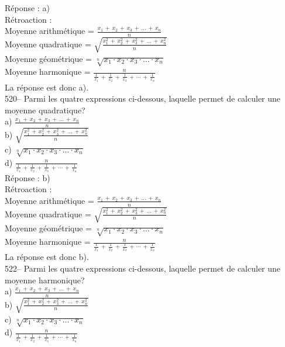 ﻿\documentclass[letterpaper, 12pt]{article}
\begin{document}
R\'eponse : a)\\

R\'etroaction : \\
Moyenne arithm\'etique =
$\frac{x_1\,+\,x_2\,+\,x_3\,+\,\ldots\,+\,x_n}{n}$\\[2mm]
Moyenne quadratique =
$\sqrt{\frac{x_1^{2}\,+\,x_2^{2}\,+\,x_3^{2}\,+\,\ldots\,+\,x_n^{2}}{n}}$\\[2mm]
Moyenne g\'eom\'etrique = $\sqrt[n]{x_1\cdot x_2\cdot x_3 \cdot \ldots \cdot
x_n}$\\[2mm]
Moyenne harmonique =
$\frac{n}{\frac{1}{x_1}\,+\,\frac{1}{x_2}\,+\,\frac{1}{x_3}\,+\,\cdots\,+\,\frac{1}{x_n}}$\\[2mm]
La r\'eponse est donc a).\\

520-- Parmi les quatre expressions ci-dessous, laquelle permet de calculer
une moyenne quadratique?\\
a) $\frac{x_1\,+\,x_2\,+\,x_3\,+\,\ldots\,+\,x_n}{n}$\\[2mm]
b)
$\sqrt{\frac{x_1^{2}\,+\,x_2^{2}\,+\,x_3^{2}\,+\,\ldots\,+\,x_n^{2}}{n}}$\\[2mm]
c) $\sqrt[n]{x_1 \cdot x_2 \cdot x_3 \cdot \ldots \cdot x_n}$\\[2mm]
d)
$\frac{n}{\frac{1}{x_1}\,+\,\frac{1}{x_2}\,+\,\frac{1}{x_3}\,+\,\cdots\,+\,\frac{1}{x_n}}$\\

R\'eponse : b)\\

R\'etroaction : \\
Moyenne arithm\'etique =
$\frac{x_1\,+\,x_2\,+\,x_3\,+\,\ldots\,+\,x_n}{n}$\\[2mm]
Moyenne quadratique =
$\sqrt{\frac{x_1^{2}\,+\,x_2^{2}\,+\,x_3^{2}\,+\,\ldots\,+\,x_n^{2}}{n}}$\\[2mm]
Moyenne g\'eom\'etrique = $\sqrt[n]{x_1\cdot x_2\cdot x_3 \cdot \ldots \cdot
x_n}$\\[2mm]
Moyenne harmonique =
$\frac{n}{\frac{1}{x_1}\,+\,\frac{1}{x_2}\,+\,\frac{1}{x_3}\,+\,\cdots\,+\,\frac{1}{x_n}}$\\[2mm]
La r\'eponse est donc b).\\


522-- Parmi les quatre expressions ci-dessous, laquelle permet de calculer
une moyenne harmonique?\\
a) $\frac{x_1\,+\,x_2\,+\,x_3\,+\,\ldots\,+\,x_n}{n}$\\[2mm]
b)
$\sqrt{\frac{x_1^{2}\,+\,x_2^{2}\,+\,x_3^{2}\,+\,\ldots\,+\,x_n^{2}}{n}}$\\[2mm]
c) $\sqrt[n]{x_1 \cdot x_2 \cdot x_3 \cdot \ldots \cdot x_n}$\\[2mm]
d)
$\frac{n}{\frac{1}{x_1}\,+\,\frac{1}{x_2}\,+\,\frac{1}{x_3}\,+\,\cdots\,+\,\frac{1}{x_n}}$\\
\end{document}
